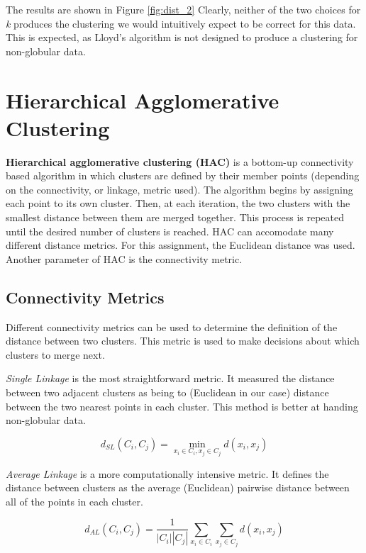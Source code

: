 \documentclass[12pt]{article}
\begin{document}
The results are shown in Figure \ref{fig:dist_2} Clearly, neither of the two
choices for \emph{k} produces the clustering we  would intuitively expect to be
correct for this data. This is expected, as Lloyd's algorithm is not designed
to produce a clustering for non-globular data.

\section{Hierarchical Agglomerative Clustering}

\textbf{Hierarchical agglomerative clustering (HAC)} is a bottom-up
connectivity based
algorithm in which clusters are defined by their member points (depending on the
connectivity, or linkage, metric used). The algorithm begins by assigning each
point to its own cluster. Then, at each iteration, the two clusters with the
smallest distance between them are merged together. This process is repeated 
until the desired number of clusters is reached. HAC can accomodate many different
distance metrics. For this assignment, the Euclidean distance was used. Another
parameter of HAC is the connectivity metric.

\subsection{Connectivity Metrics} 

Different connectivity metrics can be used to determine the definition of the
distance between two clusters. This metric is used to make decisions about
which clusters to merge next.

\textit{Single Linkage} is the most straightforward metric. It measured the distance
between two adjacent clusters as being to (Euclidean in our case) distance between
the two nearest points in each cluster. This method is better at handing non-globular
data.

\begin{equation}
  d_{SL}(C_i, C_j) = \min_{x_i \in C_i, x_j \in C_j} d(x_i, x_j)
\end{equation}

\textit{Average Linkage} is a more computationally intensive metric. It defines
the distance between clusters as the average (Euclidean) pairwise distance between
all of the points in each cluster.

\begin{equation}
  d_{AL}(C_i, C_j) = \frac{1}{|C_i| |C_j|} \sum_{x_i \in C_i} \sum_{x_j \in C_j} d(x_i, x_j)
\end{equation}
\end{document}

